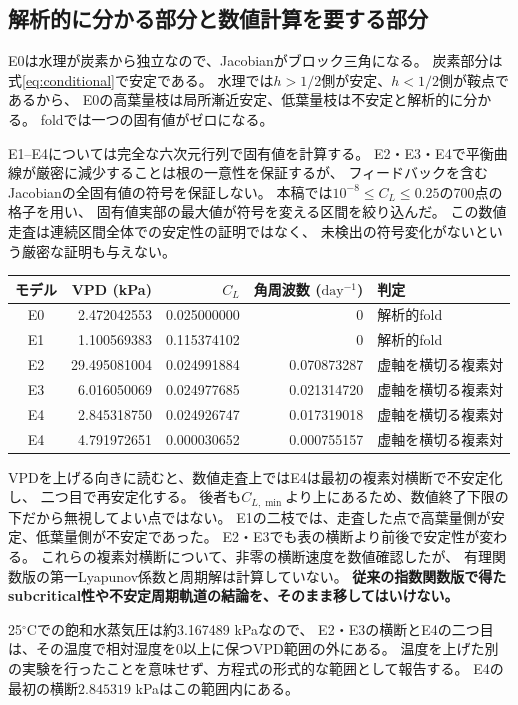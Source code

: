 \documentclass[a4paper,11pt]{ltjsarticle}
\begin{document}
\subsection{解析的に分かる部分と数値計算を要する部分}
E0は水理が炭素から独立なので、Jacobianがブロック三角になる。
炭素部分は式\eqref{eq:conditional}で安定である。
水理では$h>1/2$側が安定、$h<1/2$側が鞍点であるから、
E0の高葉量枝は局所漸近安定、低葉量枝は不安定と解析的に分かる。
foldでは一つの固有値がゼロになる。

E1--E4については完全な六次元行列で固有値を計算する。
E2・E3・E4で平衡曲線が厳密に減少することは根の一意性を保証するが、
フィードバックを含むJacobianの全固有値の符号を保証しない。
本稿では$10^{-8}\leq C_L\leq0.25$の700点の格子を用い、
固有値実部の最大値が符号を変える区間を絞り込んだ。
この数値走査は連続区間全体での安定性の証明ではなく、
未検出の符号変化がないという厳密な証明も与えない。

\begin{center}\small
\begin{tabular}{c r r r l}\toprule
モデル&VPD (kPa)&$C_L$&角周波数 ($\mathrm{day^{-1}}$)&判定\\\midrule
E0&2.472042553&0.025000000&0&解析的fold\\
E1&1.100569383&0.115374102&0&解析的fold\\
E2&29.495081004&0.024991884&0.070873287&虚軸を横切る複素対\\
E3&6.016050069&0.024977685&0.021314720&虚軸を横切る複素対\\
E4&2.845318750&0.024926747&0.017319018&虚軸を横切る複素対\\
E4&4.791972651&0.000030652&0.000755157&虚軸を横切る複素対\\
\bottomrule\end{tabular}
\end{center}
VPDを上げる向きに読むと、数値走査上ではE4は最初の複素対横断で不安定化し、
二つ目で再安定化する。
後者も$C_{L,\min}$より上にあるため、数値終了下限の下だから無視してよい点ではない。
E1の二枝では、走査した点で高葉量側が安定、低葉量側が不安定であった。
E2・E3でも表の横断より前後で安定性が変わる。
これらの複素対横断について、非零の横断速度を数値確認したが、
有理関数版の第一Lyapunov係数と周期解は計算していない。
\textbf{従来の指数関数版で得たsubcritical性や不安定周期軌道の結論を、そのまま移してはいけない。}

25$^\circ$Cでの飽和水蒸気圧は約3.167489 kPaなので、
E2・E3の横断とE4の二つ目は、その温度で相対湿度を0以上に保つVPD範囲の外にある。
温度を上げた別の実験を行ったことを意味せず、方程式の形式的な範囲として報告する。
E4の最初の横断$2.845319$ kPaはこの範囲内にある。
\end{document}
